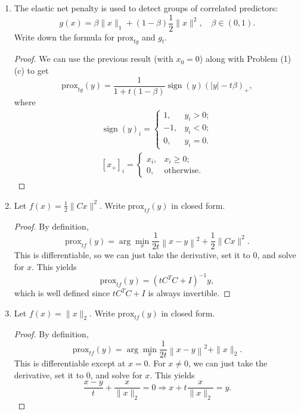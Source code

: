 \documentclass[11pt]{amsart}
\newcommand{\prox}{\mathrm{prox}}
\begin{document}
\begin{enumerate}
\begin{enumerate}
\item The elastic net penalty is used to detect groups of correlated predictors:
\[
g(x) = \beta \|x\|_1 + (1-\beta) \frac{1}{2}\|x\|^2, \quad \beta \in (0,1).
\] 
Write down the formula for $\prox_{t g}$ and $g_t$.

\begin{proof}
  We can use the previous result (with $x_0 = 0$) along with Problem (1)(c) to get
  \begin{equation*}
    \prox_{t g}(y) = \frac{1}{1 + t(1 - \beta)}\operatorname{sign}(y)\left(|y| - t\beta\right)_+,
  \end{equation*}
  where
  \begin{align*}
    \operatorname{sign}(y)_i = \begin{cases}
      1, &y_i > 0; \\
      -1, &y_i < 0; \\
      0, &y_i = 0.
    \end{cases} \\
    \left[x_+\right]_i = \begin{cases}
      x_i, &x_i \geq 0; \\
      0, &\text{otherwise}.
    \end{cases}
  \end{align*}
\end{proof}

\item Let $f(x) = \frac{1}{2}\|Cx\|^2$. Write $\prox_{t f}(y)$ in closed form.

  \begin{proof}
    By definition,
    \[      
      \prox_{t f}(y) = \arg\min_{x} \frac{1}{2t}\left\|x -  y\right\|^2 + \frac{1}{2}\|Cx\|^2.
    \]
    This is differentiable, so we can just take the derivative, set it to $0$,
    and solve for $x$. This yields
    \begin{equation*}
      \prox_{t f}(y) = \left(tC^TC + I\right)^{-1}y,
    \end{equation*}
    which is well defined since $tC^TC + I$ is always invertible.
  \end{proof}
  
\item Let $f(x) = \|x\|_2$. Write $\prox_{tf}(y)$ in closed form.

    \begin{proof}
    By definition,
    \[      
      \prox_{t f}(y) = \arg\min_{x} \frac{1}{2t}\left\|x -  y\right\|^2 + \|x\|_2.
    \]
    This is differentiable except at $x = 0$. For $x \neq 0$, we can just take
    the derivative, set it to $0$, and solve for $x$. This yields
    \begin{equation*}
      \frac{x - y}{t} + \frac{x}{\|x\|_2} = 0 \Rightarrow x + t \frac{x}{\|x\|_2} = y.
    \end{equation*}


\end{proof}
\end{enumerate}
\end{enumerate}
\end{document}
